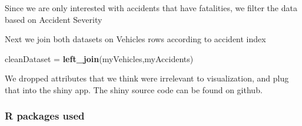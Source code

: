 \documentclass[]{article}
\newenvironment{Shaded}{\begin{snugshade}}{\end{snugshade}}
\newcommand{\KeywordTok}[1]{\textcolor[rgb]{0.13,0.29,0.53}{\textbf{#1}}}
\newcommand{\DecValTok}[1]{\textcolor[rgb]{0.00,0.00,0.81}{#1}}
\newcommand{\StringTok}[1]{\textcolor[rgb]{0.31,0.60,0.02}{#1}}
\newcommand{\CommentTok}[1]{\textcolor[rgb]{0.56,0.35,0.01}{\textit{#1}}}
\newcommand{\OperatorTok}[1]{\textcolor[rgb]{0.81,0.36,0.00}{\textbf{#1}}}
\newcommand{\NormalTok}[1]{#1}
\begin{document}
\begin{Shaded}
\end{Shaded}

Since we are only interested with accidents that have fatalities, we
filter the data based on Accident Severity

\begin{Shaded}
\end{Shaded}

Next we join both datasets on Vehicles rows according to accident index

\begin{Shaded}
\begin{Highlighting}[]
\NormalTok{cleanDataset =}\StringTok{ }\KeywordTok{left_join}\NormalTok{(myVehicles,myAccidents)}
\end{Highlighting}
\end{Shaded}

We dropped attributes that we think were irrelevant to visualization,
and plug that into the shiny app. The shiny source code can be found on
github.

\subsubsection{R packages used}\label{r-packages-used}
\end{document}
